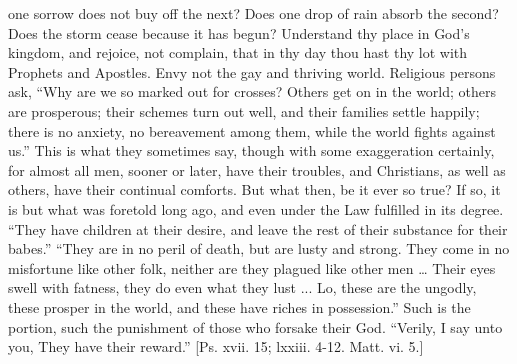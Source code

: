 one sorrow does not buy off the next? Does one drop of rain absorb the
second? Does the storm cease because it has begun? Understand thy
place in God's kingdom, and rejoice, not complain, that in thy day
thou hast thy lot with Prophets and Apostles. Envy not the gay and
thriving world. Religious persons ask, ``Why are we so marked out
for crosses? Others get on in the world; others are prosperous; their
schemes turn out well, and their families settle happily; there is no
anxiety, no bereavement among them, while the world fights against
us.'' This is what they sometimes say, though with some
exaggeration certainly, for almost all men, sooner or later, have
their troubles, and Christians, as well as others, have their continual comforts. But what then, be it ever so true? If so, it is
but what was foretold long ago, and even under the Law fulfilled in
its degree. ``They have children at their desire, and leave the
rest of their substance for their babes.'' ``They are in no
peril of death, but are lusty and strong. They come in no misfortune
like other folk, neither are they plagued like other men … Their
eyes swell with fatness, they do even what they lust ... Lo, these are
the ungodly, these prosper in the world, and these have riches in
possession.'' Such is the portion, such the punishment of those
who forsake their God. ``Verily, I say unto you, They have their
reward.'' [Ps. xvii. 15; lxxiii. 4-12. Matt. vi. 5.]


